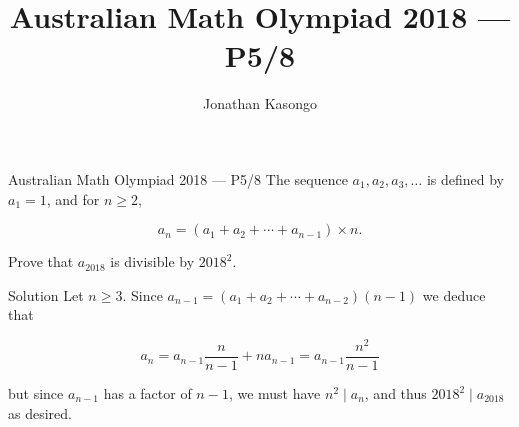 \documentclass{article}
\author{Jonathan Kasongo}
\title{Australian Math Olympiad 2018 --- P5/8}
\begin{document}
\maketitle

\begin{problem}{Australian Math Olympiad 2018 --- P5/8}
The sequence $a_1, a_2, a_3, \ldots$ is defined by $a_1 = 1$, and for
$n \geq 2$,

$$
a_n = (a_1 + a_2 + \cdots + a_{n-1}) \times n.
$$

Prove that $a_{2018}$ is divisible by $2018^2$.
\end{problem}

\begin{solution}{Solution}
Let $n \geq 3$.
Since $a_{n-1} = (a_1 + a_2 + \cdots + a_{n-2})(n-1)$ we deduce that

$$
a_n = a_{n-1} \frac{n}{n-1} + na_{n-1} = a_{n-1} \frac{n^2}{n-1}
$$

but since $a_{n-1}$ has a factor of $n-1$, we must have $n^2 \mid a_n$, and
thus $2018^2 \mid a_{2018}$ as desired.
\end{solution}
\end{document}
